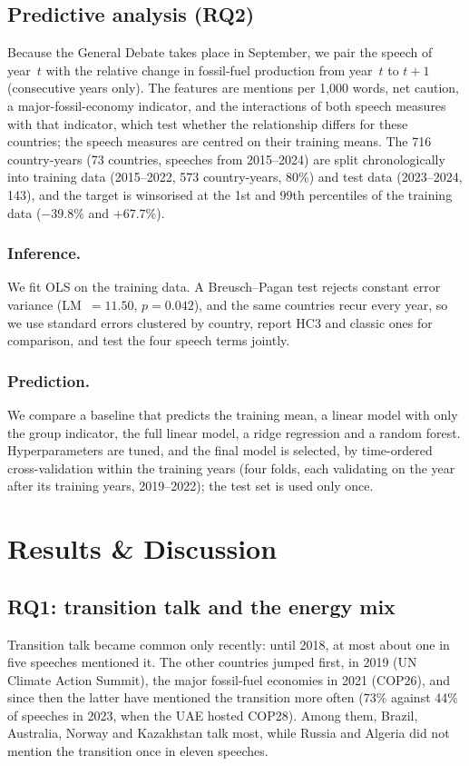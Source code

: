 \documentclass{llncs}
\begin{document}
\subsection{Predictive analysis (RQ2)}\label{sec:predictive}
Because the General Debate takes place in September, we pair the speech of year~$t$ with the relative change in fossil-fuel production from year~$t$ to $t+1$ (consecutive years only). The features are mentions per 1{,}000 words, net caution, a major-fossil-economy indicator, and the interactions of both speech measures with that indicator, which test whether the relationship differs for these countries; the speech measures are centred on their training means. The 716 country-years (73 countries, speeches from 2015--2024) are split chronologically into training data (2015--2022, 573 country-years, 80\%) and test data (2023--2024, 143), and the target is winsorised at the 1st and 99th percentiles of the training data ($-39.8\%$ and $+67.7\%$).

\subsubsection{Inference.} We fit OLS on the training data. A Breusch--Pagan test rejects constant error variance (LM~$= 11.50$, $p = 0.042$), and the same countries recur every year, so we use standard errors clustered by country, report HC3 and classic ones for comparison, and test the four speech terms jointly.

\subsubsection{Prediction.} We compare a baseline that predicts the training mean, a linear model with only the group indicator, the full linear model, a ridge regression and a random forest. Hyperparameters are tuned, and the final model is selected, by time-ordered cross-validation within the training years (four folds, each validating on the year after its training years, 2019--2022); the test set is used only once.

\section{Results \& Discussion}\label{sec:results}
\subsection{RQ1: transition talk and the energy mix}
Transition talk became common only recently: until 2018, at most about one in five speeches mentioned it. The other countries jumped first, in 2019 (UN Climate Action Summit), the major fossil-fuel economies in 2021 (COP26), and since then the latter have mentioned the transition more often (73\% against 44\% of speeches in 2023, when the UAE hosted COP28). Among them, Brazil, Australia, Norway and Kazakhstan talk most, while Russia and Algeria did not mention the transition once in eleven speeches.
\end{document}

